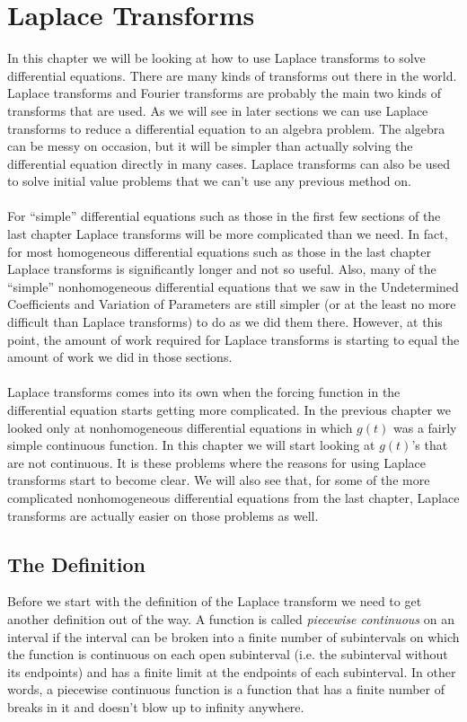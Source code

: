 \documentclass[10pt,reqno]{book}
\theoremstyle{definition}
\begin{document}
	\chapter{Laplace Transforms}
	In this chapter we will be looking at how to use Laplace transforms to solve differential equations. There are many kinds of transforms out there in the world. Laplace transforms and Fourier transforms are probably the main two kinds of transforms that are used. As we will see in later sections we can use Laplace transforms to reduce a differential equation to an algebra problem. The algebra can be messy on occasion, but it will be simpler than actually solving the differential equation directly in many cases. Laplace transforms can also be used to solve initial value problems that we can't use any previous method on.\\ \\
	For ``simple'' differential equations such as those in the first few sections of the last chapter Laplace transforms will be more complicated than we need. In fact, for most homogeneous differential equations such as those in the last chapter Laplace transforms is significantly longer and not so useful. Also, many of the 	``simple'' nonhomogeneous differential equations that we saw in the Undetermined Coefficients and Variation of Parameters are still simpler (or at the least no more difficult than Laplace transforms) to do as we did them there. However, at this point, the amount of work required for Laplace transforms is starting to equal the amount of work we did in those sections. \\ \\
	Laplace transforms comes into its own when the forcing function in the differential equation starts getting more complicated.  In the previous chapter we looked only at nonhomogeneous differential equations in which $ g(t) $ was a fairly simple continuous function. In this chapter we will start looking at $ g(t) $'s that are not continuous. It is these problems where the reasons for using Laplace transforms start to become clear. We will also see that, for some of the more complicated nonhomogeneous differential equations from the last chapter, Laplace transforms are actually easier on those problems as well.
	
	\section{The Definition}
	Before we start with the definition of the Laplace transform we need to get another definition out of the way. A function is called \textit{piecewise continuous} on an interval if the interval can be broken into a finite number of subintervals on which the function is continuous on each open subinterval (i.e. the subinterval without its endpoints) and has a finite limit at the endpoints of each subinterval. In other words, a piecewise continuous function is a function that has a finite number of breaks in it and doesn't blow up to infinity anywhere.
	
\end{document}
